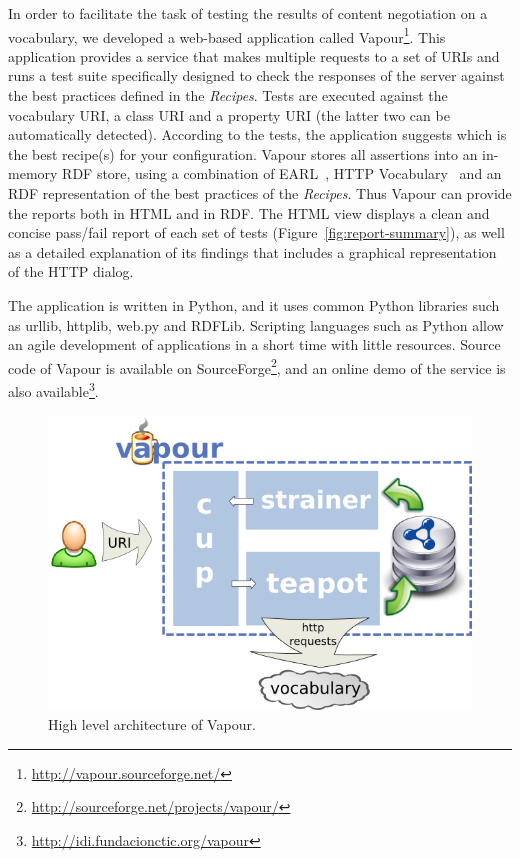 \documentclass{../templates/llncs}
\begin{document}
In order to facilitate the task of testing the results of content negotiation on a vocabulary, we developed a web-based application called Vapour\footnote{\url{http://vapour.sourceforge.net/}}. This application provides a service that makes multiple requests to a set of URIs and runs a test suite
specifically designed to check the responses 
of the server against the best practices defined in the \textit{Recipes}.
Tests are executed against the vocabulary
URI, a class URI and a property URI (the latter two can be automatically detected).
According to the tests, the application suggests which is the 
best recipe(s) for your configuration. Vapour stores all assertions into an in-memory RDF store, using a combination of EARL~\cite{EARL}, HTTP
Vocabulary~\cite{Koch2007} and an RDF representation of the best practices of the \textit{Recipes}. Thus Vapour 
can provide the reports both in HTML and in RDF. The HTML view
displays a clean and concise pass/fail report of each set of tests (Figure~\ref{fig:report-summary}),
as  well as a detailed explanation of its findings that
includes a graphical representation of the HTTP dialog.

The application is written in Python, and it uses common
Python libraries such as urllib, httplib, web.py and RDFLib. Scripting languages such 
as Python allow an agile development of applications in a short time with little 
resources. Source code of Vapour is available on 
SourceForge\footnote{\url{http://sourceforge.net/projects/vapour/}},
and an online demo of the service is also available\footnote{\url{http://idi.fundacionctic.org/vapour}}.

\begin{figure}
 \centering
 \includegraphics[width=12cm]{images/arch.png}
 \caption{\label{fig:arch}High level architecture of Vapour.}
\end{figure}
\end{document}
